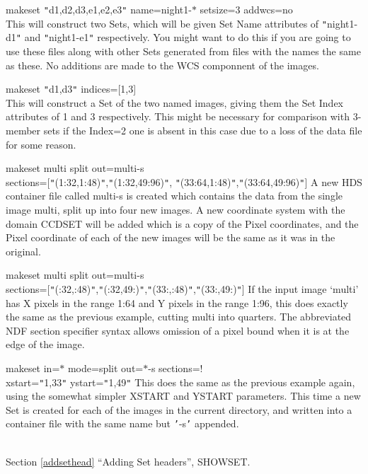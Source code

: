 \documentclass[twoside,11pt]{article}
\newcommand{\htmlref}[2]{#1}
\newcommand{\latexhtml}[2]{#1}
\renewcommand{\_}{\texttt{\symbol{95}}}
\newcommand{\xroutine}[1]{\htmlref{{\sc #1}}{#1}}
\newcommand{\secref}[2]{\latexhtml{Section \ref{#1} ``#2''}{``\htmlref{#2}{#1}''}}
\newcommand{\sstexamplesubsection}[2]{\sloppy \item{\ssttt #1} \mbox{} \\ #2 }
\newcommand{\sstnotes}[1]{\item[Notes:] \mbox{} \\[1.3ex] #1}
\newcommand{\sstdiytopic}[2]{\item[#1:] \mbox{} \\[1.3ex] #2}
\newcommand{\sstitemlist}[1]{
  \mbox{} \\
  \vspace{-3.5ex}
  \begin{itemize}
     #1
  \end{itemize}
}
\newcommand{\sstexamplesubsection}[2]{\item[{\ssttt #1}] #2}
\newcommand{\sstnotes}[1]{\item[Notes:] #1 }
\newcommand{\sstdiytopic}[2]{\item[{#1:}] #2 }
\newcommand{\sstitemlist}[1]{
      \begin{itemize}
         #1
      \end{itemize}
      \\
   }
\begin{document}
{{{      }
      \sstexamplesubsection{
         makeset {\tt "}d1,d2,d3,e1,e2,e3{\tt "} name=night1-$*$ setsize=3 addwcs=no
      }{
         This will construct two Sets, which will be given Set Name
         attributes of {\tt "}night1-d1{\tt "} and {\tt "}night1-e1{\tt "} respectively.
         You might want to do this if you are going to use these
         files along with other Sets generated from files with the
         names the same as these.  No additions are made to the
         WCS componnent of the images.
      }
      \sstexamplesubsection{
         makeset {\tt "}d1,d3{\tt "} indices=[1,3]
      }{
         This will construct a Set of the two named images, giving them
         the Set Index attributes of 1 and 3 respectively.  This
         might be necessary for comparison with 3-member sets if the
         Index=2 one is absent in this case due to a loss of the data
         file for some reason.
      }
      \sstexamplesubsection{
         makeset multi split out=multi-s
      }{
              sections=[{\tt "}(1:32,1:48){\tt "},{\tt "}(1:32,49:96){\tt "},
                        {\tt "}(33:64,1:48){\tt "},{\tt "}(33:64,49:96){\tt "}]
         A new HDS container file called multi-s is created which
         contains the data from the single image multi, split up
         into four new images.  A new coordinate system with the
         domain CCD\_SET will be added which is a copy of the
         Pixel coordinates, and the Pixel coordinate of each of
         the new images will be the same as it was in the original.
      }
      \sstexamplesubsection{
         makeset multi split out=multi-s
      }{
              sections=[{\tt "}(:32,:48){\tt "},{\tt "}(:32,49:){\tt "},{\tt "}(33:,:48){\tt "},{\tt "}(33:,49:){\tt "}]
         If the input image `multi' has X pixels in the range 1:64 and
         Y pixels in the range 1:96, this does exactly the same as
         the previous example, cutting multi into quarters.  The
         abbreviated NDF section specifier syntax allows omission
         of a pixel bound when it is at the edge of the image.
      }
      \sstexamplesubsection{
         makeset in=$*$ mode=split out=$*$-s sections=!
      }{
              xstart={\tt "}1,33{\tt "} ystart={\tt "}1,49{\tt "}
         This does the same as the previous example again, using the
         somewhat simpler XSTART and YSTART parameters.  This time
         a new Set is created for each of the images in the current
         directory, and written into a container file with the
         same name but {\tt '}-s{\tt '} appended.
      }
   }
   \sstdiytopic{
      See also
   } {
      \secref{addsethead}{Adding Set headers},
      \xroutine{SHOWSET}.
   }
   \sstnotes{
      \sstitemlist{

}}}
\end{document}
